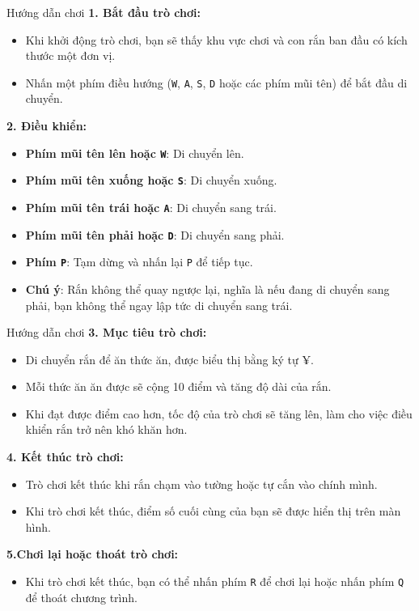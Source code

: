 \documentclass{beamer}
\begin{document}
\begin{frame}{Hướng dẫn chơi}
    \textbf{1. Bắt đầu trò chơi:}
    \begin{itemize}
        \item Khi khởi động trò chơi, bạn sẽ thấy khu vực chơi và con rắn ban đầu có kích thước một đơn vị.
        \item Nhấn một phím điều hướng (\texttt{W}, \texttt{A}, \texttt{S}, \texttt{D} hoặc các phím mũi tên) để bắt đầu di chuyển.
    \end{itemize}
    \textbf{2. Điều khiển:}
    \begin{itemize}
        \item \textbf{Phím mũi tên lên hoặc \texttt{W}}: Di chuyển lên.
        \item \textbf{Phím mũi tên xuống hoặc \texttt{S}}: Di chuyển xuống.
        \item \textbf{Phím mũi tên trái hoặc \texttt{A}}: Di chuyển sang trái.
        \item \textbf{Phím mũi tên phải hoặc \texttt{D}}: Di chuyển sang phải.
        \item \textbf{Phím \texttt{P}}: Tạm dừng và nhấn lại \texttt{P} để tiếp tục.
        \item \textbf{Chú ý}: Rắn không thể quay ngược lại, nghĩa là nếu đang di chuyển sang phải, bạn không thể ngay lập tức di chuyển sang trái.
    \end{itemize}
\end{frame}
\begin{frame}{Hướng dẫn chơi}
    \textbf{3. Mục tiêu trò chơi:}
    \begin{itemize}
        \item Di chuyển rắn để ăn thức ăn, được biểu thị bằng ký tự ¥.
        \item Mỗi thức ăn ăn được sẽ cộng 10 điểm và tăng độ dài của rắn.
        \item Khi đạt được điểm cao hơn, tốc độ của trò chơi sẽ tăng lên, làm cho việc điều khiển rắn trở nên khó khăn hơn.
    \end{itemize}
    \textbf{4. Kết thúc trò chơi:}
    \begin{itemize}
        \item Trò chơi kết thúc khi rắn chạm vào tường hoặc tự cắn vào chính mình.
        \item Khi trò chơi kết thúc, điểm số cuối cùng của bạn sẽ được hiển thị trên màn hình.
    \end{itemize}
    \textbf{5.Chơi lại hoặc thoát trò chơi:}
    \begin{itemize}
        \item Khi trò chơi kết thúc, bạn có thể nhấn phím \texttt{R} để chơi lại hoặc nhấn phím \texttt{Q} để thoát chương trình.
    \end{itemize}
\end{frame}
\end{document}
